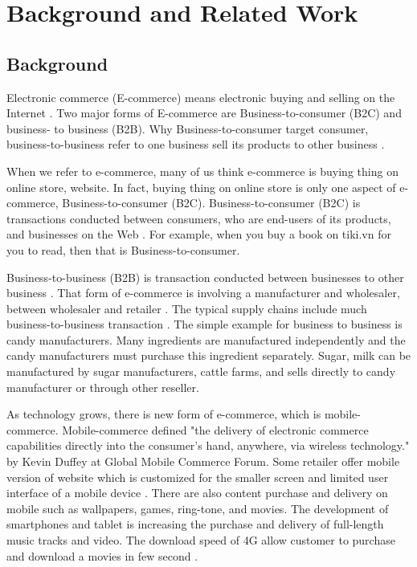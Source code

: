 \documentclass[conference]{IEEEtran}
\begin{document}


\section{Background and Related Work} \label{background}
\subsection{Background}
Electronic commerce (E-commerce) means electronic buying and selling on the Internet \cite{bidgoli2002electronic}. Two major forms of E-commerce are Business-to-consumer (B2C) and business- to business (B2B). Why Business-to-consumer target consumer, business-to-business refer to one business sell its products to other business \cite{readingEcommerce2009}.

When we refer to e-commerce, many of us think e-commerce is buying thing on online store, website. In fact, buying thing on online store is only one aspect of e-commerce, Business-to-consumer (B2C). Business-to-consumer (B2C) is transactions conducted between consumers, who are end-users of its products, and businesses on the Web \cite{ec2010Gary}. For example, when you buy a book on tiki.vn for you to read, then that is Business-to-consumer.

Business-to-business (B2B) is transaction conducted between businesses to other business \cite{ec2010Gary}. That form of e-commerce is involving a manufacturer and wholesaler, between wholesaler and retailer \cite{btb2015}. The typical supply chains include much business-to-business transaction \cite{btb2015}. The simple example for business to business is candy manufacturers. Many ingredients are manufactured independently and the candy manufacturers must purchase this ingredient separately. Sugar, milk can be manufactured by sugar manufacturers, cattle farms, and sells directly to candy manufacturer or through other reseller.

As technology grows, there is new form of e-commerce, which is mobile-commerce. Mobile-commerce defined "the delivery of electronic commerce capabilities directly into the consumer’s hand, anywhere, via wireless technology." by Kevin Duffey at Global Mobile Commerce Forum. Some retailer offer mobile version of website which is customized for the smaller screen and limited user interface of a mobile device \cite{ectomobile2015}. There are also content purchase and delivery on mobile such as wallpapers, games, ring-tone, and movies. The development of smartphones and tablet is increasing the purchase and delivery of full-length music tracks and video. The download speed of 4G allow customer to purchase and download a movies in few second \cite{niranjanamurthy2013analysis}.
\end{document}
